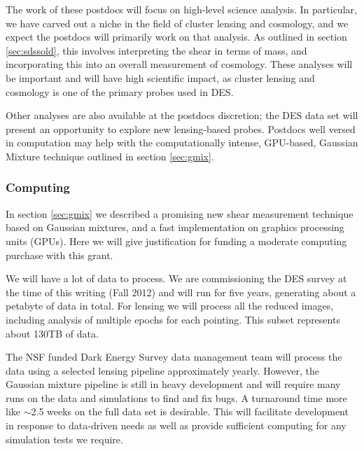 \documentclass[12pt]{article}
\newcommand{\commissdate}{Fall 2012}
\begin{document}
The work of these postdocs will focus on high-level science analysis.  In
particular, we have carved out a niche in the field of cluster lensing and
cosmology, and we expect the postdocs will primarily work on that analysis.  As
outlined in section \ref{sec:sdssold}, this involves interpreting the shear in
terms of mass, and incorporating this into an overall measurement of cosmology.
These analyses will be important and will have high scientific impact, as
cluster lensing and cosmology is one of the primary probes used in DES.

Other analyses are also available at the postdocs discretion; the DES data set
will present an opportunity to explore new lensing-based probes.  Postdocs well
versed in computation may help with the computationally intense, GPU-based,
Gaussian Mixture technique outlined in section \ref{sec:gmix}.

\subsubsection{Computing} \label{sec:computing}

In section \ref{sec:gmix} we described a promising new shear measurement
technique based on Gaussian mixtures, and a fast implementation on graphics
processing units (GPUs).  Here we will give justification for funding a
moderate computing purchase with this grant.

We will have a lot of data to process.  We are commissioning the DES survey at
the time of this writing (\commissdate) and will run for five years, generating
about a petabyte of data in total.  For lensing we will process all the reduced
images, including analysis of multiple epochs for each pointing.  This subset
represents about 130TB of data.

The NSF funded Dark Energy Survey data management team will process the data
using a selected lensing pipeline approximately yearly.  However, the Gaussian
mixture pipeline is still in heavy development and will require many runs on
the data and simulations to find and fix bugs.  A turnaround time more like
$\sim$2.5 weeks on the full data set is desirable.   This will facilitate
development in response to data-driven needs as well as provide sufficient
computing for any simulation tests we require.

\end{document}
